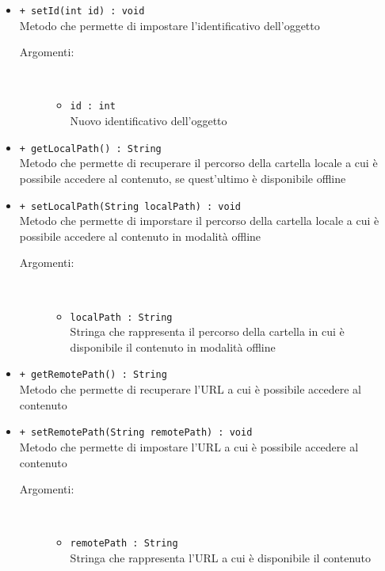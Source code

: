 \documentclass[../Tesi.tex]{subfiles}
\begin{document}
\begin{description}
\begin{itemize}
				\item \texttt{+ setId(int id) : void}\\
				Metodo che permette di impostare l'identificativo dell'oggetto
				\begin{description}
					\item[Argomenti:] \
					\begin{itemize}
						\item \texttt{id : int}\\
						Nuovo identificativo dell'oggetto
					\end{itemize}
				\end{description}

				\item \texttt{+ getLocalPath() : String}\\
				Metodo che permette di recuperare il percorso della cartella locale a cui è possibile accedere al contenuto, se quest'ultimo è disponibile offline

				\item \texttt{+ setLocalPath(String localPath) : void}\\
				Metodo che permette di imporstare il percorso della cartella locale a cui è possibile accedere al contenuto in modalità offline
				\begin{description}
					\item[Argomenti:] \
					\begin{itemize}
						\item \texttt{localPath : String}\\
						Stringa che rappresenta il percorso della cartella in cui è disponibile il contenuto in modalità offline
					\end{itemize}
				\end{description}

				\item \texttt{+ getRemotePath() : String}\\
				Metodo che permette di recuperare l'URL a cui è possibile accedere al contenuto

				\item \texttt{+ setRemotePath(String remotePath) : void}\\
				Metodo che permette di impostare l'URL a cui è possibile accedere al contenuto
				\begin{description}
					\item[Argomenti:] \
					\begin{itemize}
						\item \texttt{remotePath : String}\\
						Stringa che rappresenta l'URL a cui è disponibile il contenuto
					\end{itemize}
				\end{description}


\end{itemize}
\end{description}
\end{document}

